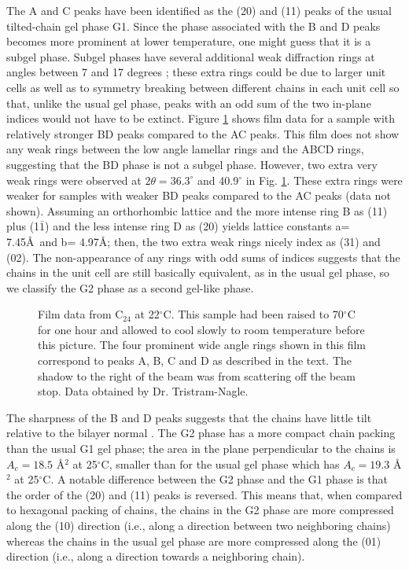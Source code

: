 The A and C peaks have been identified as the (20) and (11)
peaks of the usual tilted-chain gel phase G1.  Since the phase associated with
the B and D peaks becomes more prominent at lower temperature, one might
guess that it is a subgel phase.  Subgel phases have several
additional weak diffraction rings at angles between 7 and 17 degrees
\cite{RuoS82A,RuoS82B,Stum83,STN94}; 
these extra rings could be due to larger unit cells as well as 
to symmetry breaking between different chains in each unit cell 
so that, unlike the usual gel phase, peaks with an odd sum of the two 
in-plane indices would not have to be extinct. Figure \ref{anol:fig5}
 shows film data 
for a sample with relatively stronger BD peaks compared to the AC peaks.
This film does not show any weak rings between the low angle lamellar rings
and the ABCD rings, suggesting that the BD phase is not a subgel phase.
However, two extra very weak rings were observed at $2\theta = 36.3^{\circ}$ 
and 40.9$^{\circ}$ in Fig. \ref{anol:fig5}.  These extra rings were 
weaker for samples with
weaker BD peaks compared to the AC peaks (data not shown).
Assuming an orthorhombic lattice and the more intense ring B as (11) plus 
(1$\bar{1}$)
and the less intense ring D as (20) yields lattice constants 
a= 7.45\AA\ and b= 4.97\AA ;
then, the two extra weak rings nicely index as (31) and (02).  
The non-appearance of 
any rings with odd sums of indices suggests that the chains in the unit cell 
are still basically equivalent, as in the usual gel phase,
so we classify the G2 phase as a second gel-like phase.

\begin{figure}[t]
\centerline {}
\caption{Film data from C$_{24}$ at 22$^{\circ}$C. This sample had been
raised to 70$^{\circ}$C for one hour and allowed to cool slowly to room
temperature before this picture. The four prominent wide angle rings shown in
this film correspond to peaks A, B, C and D as described in the text. 
The shadow to the right of the beam was from scattering off the beam stop.
Data obtained by Dr. Tristram-Nagle.
\label{anol:fig5}}
\end{figure}

The sharpness of the B and D peaks suggests that the chains have little 
tilt relative to the bilayer normal \cite{Smi88,McI80}. The G2 phase has a
more compact chain packing than the usual G1 gel phase;
the area in the plane perpendicular to the
chains is $A_c = 18.5$ \AA$^2$ at 25$^{\circ}$C, smaller
than for the usual gel phase which has $A_c = 19.3$ \AA$^2$ at 25$^{\circ}$C.
A notable difference between the G2 phase and the G1 phase is that the
order of the (20) and (11) peaks is reversed.  This means that, when
compared to hexagonal packing of chains, the chains in the
G2 phase are more compressed along the (10) direction (i.e., along a 
direction between two neighboring chains) whereas the chains in the usual gel 
phase are more compressed along the (01) direction (i.e., along a 
direction towards a neighboring chain).

